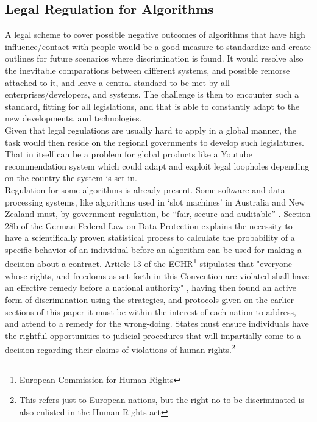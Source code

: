 \subsection{Legal Regulation for Algorithms}
\label{legal}
A legal scheme to cover possible negative outcomes of algorithms that have high influence/contact with people would be a good measure to standardize and create outlines for future scenarios where discrimination is found. It would resolve also the inevitable comparations between different systems, and possible remorse attached to it, and leave a central standard to be met by all enterprises/developers, and systems. The challenge is then to encounter such a standard, fitting for all legislations, and that is able to constantly adapt to the new developments, and technologies.\\
Given that legal regulations are usually hard to apply in a global manner, the task would then reside on the regional governments to develop such legislatures. That in itself can be a problem for global products like a Youtube recommendation system which could adapt and exploit legal loopholes depending on the country the system is set in.\\
Regulation for some algorithms is already present. Some software and data processing systems, like algorithms used in ‘slot machines’ in Australia and New Zealand must, by government regulation, be “fair, secure and auditable” \cite{LWT*08}. Section 28b of the German Federal Law on Data Protection explains the necessity to have a scientifically proven statistical process to calculate the probability of a specific behavior of an individual before an algorithm can be used for making a decision about a contract.
Article 13 of the ECHR\footnote{European Commission for Human Rights} stipulates that "everyone whose rights, and freedoms as set forth in this Convention are violated shall have an effective remedy before a national authority" \cite{ECHR21}, having then found an active form of discrimination using the strategies, and protocols given on the earlier sections of this paper  it must be within the interest of each nation to address, and attend to a remedy for the wrong-doing. States must ensure individuals have the rightful opportunities to judicial procedures that will impartially come to a decision regarding their claims of violations of human rights.\footnote{This refers just to European nations, but the right no to be discriminated is also enlisted in the Human Rights act}\\

